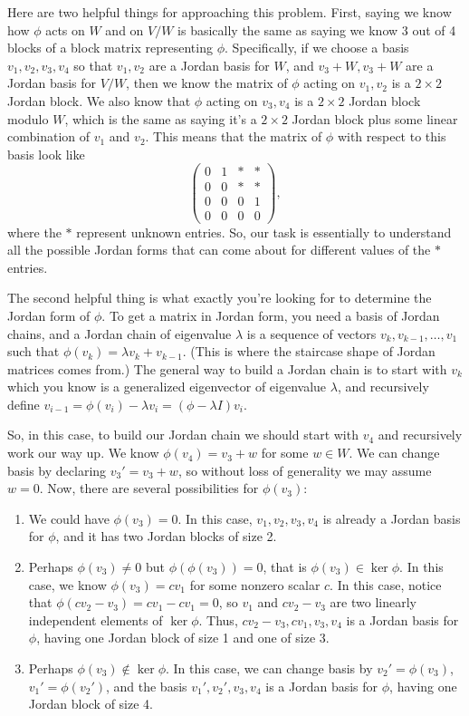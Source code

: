 \begin{solution}
Here are two helpful things for approaching this problem. First, saying we know how $\phi$ acts on $W$ and on $V/W$ is basically the same as saying we know 3 out of 4 blocks of a block matrix representing $\phi$. Specifically, if we choose a basis $v_1, v_2,v_3,v_4$ so that $v_1,v_2$ are a Jordan basis for $W$, and $v_3 + W, v_3 + W$ are a Jordan basis for $V/W$, then we know the matrix of $\phi$ acting on $v_1, v_2$ is a $2 \times 2$ Jordan block. We also know that $\phi$ acting on $v_3,v_4$ is a $2 \times 2$ Jordan block modulo $W$, which is the same as saying it's a $2 \times 2$ Jordan block plus some linear combination of $v_1$ and $v_2$. This means that the matrix of $\phi$ with respect to this basis look like
\[\begin{pmatrix}
0 & 1 & \ast & \ast \\
0 & 0 & \ast & \ast \\
0 & 0 & 0 & 1 \\
0 & 0 & 0 & 0
\end{pmatrix},\]
where the $\ast$ represent unknown entries. So, our task is essentially to understand all the possible Jordan forms that can come about for different values of the $\ast$ entries.

The second helpful thing is what exactly you're looking for to determine the Jordan form of $\phi$. To get a matrix in Jordan form, you need a basis of Jordan chains, and a Jordan chain of eigenvalue $\lambda$ is a sequence of vectors $v_k, v_{k-1},\dots,v_1$ such that $\phi(v_k) = \lambda v_k + v_{k-1}$. (This is where the staircase shape of Jordan matrices comes from.) The general way to build a Jordan chain is to start with $v_k$ which you know is a generalized eigenvector of eigenvalue $\lambda$, and recursively define $v_{i-1} = \phi(v_i) - \lambda v_i = (\phi - \lambda I)v_i$.

So, in this case, to build our Jordan chain we should start with $v_4$ and recursively work our way up. We know $\phi(v_4) = v_3 + w$ for some $w \in W$. We can change basis by declaring $v_3' = v_3 + w$, so without loss of generality we may assume $w = 0$. Now, there are several possibilities for $\phi(v_3)$:
\begin{enumerate}
    \item We could have $\phi(v_3) = 0$. In this case, $v_1,v_2,v_3,v_4$ is already a Jordan basis for $\phi$, and it has two Jordan blocks of size 2.
    \item Perhaps $\phi(v_3) \neq 0$ but $\phi(\phi(v_3)) = 0$, that is $\phi(v_3) \in \ker \phi$. In this case, we know $\phi(v_3) = cv_1$ for some nonzero scalar $c$. In this case, notice that $\phi(cv_2-v_3) = cv_1 - cv_1 = 0$, so $v_1$ and $cv_2 - v_3$ are two linearly independent elements of $\ker \phi$. Thus, $cv_2 - v_3, cv_1, v_3, v_4$ is a Jordan basis for $\phi$, having one Jordan block of size 1 and one of size 3.
    \item Perhaps $\phi(v_3) \notin \ker\phi$. In this case, we can change basis by $v_2' = \phi(v_3)$, $v_1' = \phi(v_2')$, and the basis $v_1', v_2', v_3, v_4$ is a Jordan basis for $\phi$, having one Jordan block of size 4.
\end{enumerate}


\end{solution}
